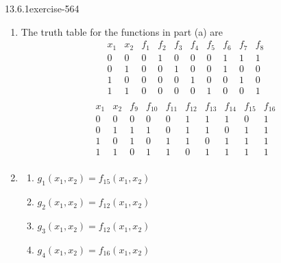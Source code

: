 \documentclass[twoside,10pt,]{book}
\numberwithin{equation}{section}
\begin{document}
\begin{divisionsolution}{13.6.1}{}{exercise-564}
\begin{enumerate}[label=(\alph*)]
\item\hypertarget{li-2276}{}\hypertarget{p-5024}{}%
The truth table for the functions in part (a) are%
\begin{equation*}
\begin{array}{llllllllll}
x_1 & x_2 & f_1 & f_2 & f_3 & f_4 & f_5 & f_6 & f_7 & f_8\\
0 & 0 & 0 & 1 & 0 & 0 & 0 & 1 & 1 & 1  \\
0 & 1 & 0 & 0 & 1 & 0 & 0 & 1 & 0 & 0\\
1 & 0 & 0 & 0 & 0 & 1 & 0 & 0 & 1 & 0 \\
1 & 1 & 0 & 0 & 0 & 0 & 1 & 0 & 0 & 1 \\
\end{array}
\end{equation*}
%
\begin{equation*}
\begin{array}{llllllllll}
x_1 & x_2 &  f_9 & f_{10} & f_{11} & f_{12} & f_{13} & f_{14} & f_{15} & f_{16} \\
0 & 0 & 0 & 0 & 0 & 1 & 1 & 1 & 0 & 1 \\
0 & 1 & 1 & 1 & 0 & 1 & 1 & 0 & 1 & 1 \\
1 & 0 &  1 & 0 & 1 & 1 & 0 & 1 & 1 & 1 \\
1 & 1 &  0 & 1 & 1 & 0 & 1 & 1 & 1 & 1 \\
\end{array}
\end{equation*}
%
\item\hypertarget{li-2277}{}\hypertarget{p-5025}{}%
%
\begin{enumerate}[label=(\roman*)]
\item\hypertarget{li-2278}{}\hypertarget{p-5026}{}%
\(g_1\left(x_1,x_2\right)=f_{15}\left(x_1,x_2\right)\)%
\item\hypertarget{li-2279}{}\hypertarget{p-5027}{}%
\(g_2\left(x_1,x_2\right)=f_{12}\left(x_1,x_2\right)\)%
\item\hypertarget{li-2280}{}\hypertarget{p-5028}{}%
\(g_3\left(x_1,x_2\right)=f_{12}\left(x_1,x_2\right)\)%
\item\hypertarget{li-2281}{}\hypertarget{p-5029}{}%
\(g_4\left(x_1,x_2\right)=f_{16}\left(x_1,x_2\right)\)%
\end{enumerate}
%
\end{enumerate}
%
\end{divisionsolution}%
\end{document}
